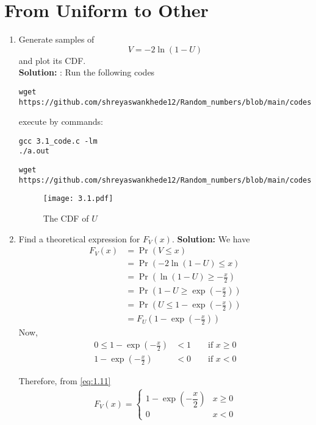 \documentclass[journal,12pt,twocolumn]{IEEEtran}
\renewcommand\thesection{\arabic{section}}
\providecommand{\pr}[1]{\ensuremath{\Pr\left(#1\right)}}
\providecommand{\brak}[1]{\ensuremath{\left(#1\right)}}
\theoremstyle{remark}
\newcommand{\solution}{\noindent \textbf{Solution: }}
\numberwithin{equation}{section}
\begin{document}
\section{From Uniform to Other}
\begin{enumerate}[label=\thesection.\arabic*
,ref=\thesection.\theenumi]
%
\item
Generate samples of 
%
\begin{equation}
V = -2\ln\brak{1-U}
\end{equation}
%
and plot its CDF. \\
\solution: Run the following codes
\begin{lstlisting}
wget https://github.com/shreyaswankhede12/Random_numbers/blob/main/codes/3.1_code.c
\end{lstlisting}
execute by commands:
\begin{lstlisting}
gcc 3.1_code.c -lm
./a.out
\end{lstlisting}
\begin{lstlisting}
wget https://github.com/shreyaswankhede12/Random_numbers/blob/main/codes/3.1_plot.py
\end{lstlisting}
\begin{figure}
\centering
\texttt{[image: 3.1.pdf]}
\caption{The CDF of $U$}
\label{fig:3.1}
\end{figure}
\item Find a theoretical expression for $F_V(x)$.
\solution We have
	\begin{align}
		F_V(x) &= \pr{V \le x} \\
		&= \pr{-2\ln\brak{1-U} \le x} \\
		&= \pr{\ln\brak{1-U} \ge -\frac{x}{2}} \\
		&= \pr{1-U \ge \exp\brak{-\frac{x}{2}}} \\
		&= \pr{U \le 1 - \exp\brak{-\frac{x}{2}}} \\
		&= F_U\brak{1 - \exp\brak{-\frac{x}{2}}}
	\end{align}
	Now,
	\begin{align}
		0 \le 1-\exp\brak{-\frac{x}{2}} &< 1 \qquad \text{if } x \ge 0	\\	
		1-\exp\brak{-\frac{x}{2}} &< 0 \qquad \text{if } x < 0	
	\end{align}
	
	Therefore, from \eqref{eq:1.11}
	\begin{align}
		F_V(x) = 
		\begin{cases}
			1-\exp\brak{-\dfrac{x}{2}} & x \ge 0 \\
			0 & x < 0
		\end{cases}
	\end{align}
%
\end{enumerate}
\end{document}
